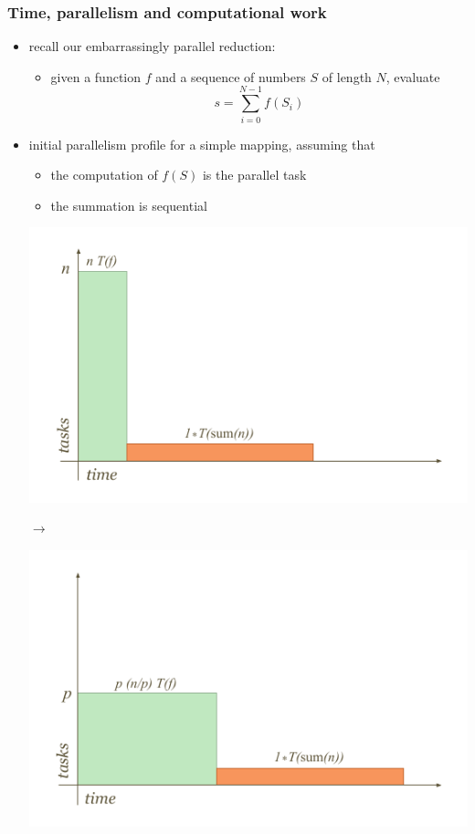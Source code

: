 %
%


\begin{frame}[fragile]
%
  \frametitle{Time, parallelism and computational work}
%
  \begin{itemize}
  \item recall our embarrassingly parallel reduction: 
    \begin{itemize}
    \item given a function $f$ and a sequence of numbers $S$ of length $N$, evaluate
    \[
    s = \sum_{i=0}^{N-1}f(S_{i})
    \]
    \end{itemize}
%
  \item initial parallelism profile for a simple mapping, assuming that
    \begin{itemize}
    \item the computation of $f(S)$ is the parallel task
    \item the summation is sequential
    \end{itemize}
%
    \begin{minipage}{.45\linewidth}
      \includegraphics[scale=0.6]{figures/reduction-parallel-work.pdf}
    \end{minipage}
    $\longrightarrow$
    \begin{minipage}{.45\linewidth}
      \includegraphics[scale=0.6]{figures/reduction-partitioned-work.pdf}

\end{minipage}
\end{itemize}
\end{frame}
